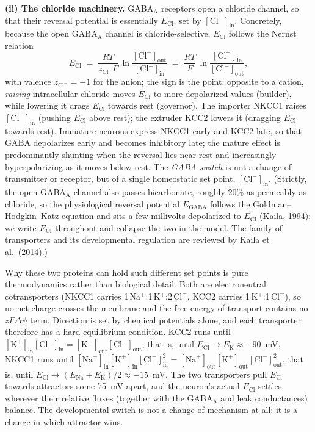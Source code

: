 \documentclass[11pt,a4paper]{article}
\newcommand{\Clm}{\mathrm{Cl}^{-}}
\newcommand{\ECl}{E_{\mathrm{Cl}}}
\begin{document}
\textbf{(ii) The chloride machinery.} GABA$_{\mathrm{A}}$ receptors open a chloride channel, so that their reversal potential is essentially $\ECl$, set by $[\Clm]_{\mathrm{in}}$. Concretely, because the open GABA$_{\mathrm{A}}$ channel is chloride-selective, $\ECl$ follows the Nernst relation
\begin{equation}
\ECl \;=\; \frac{RT}{z_{\Clm}F}\,\ln\frac{[\Clm]_{\mathrm{out}}}{[\Clm]_{\mathrm{in}}}
     \;=\; \frac{RT}{F}\,\ln\frac{[\Clm]_{\mathrm{in}}}{[\Clm]_{\mathrm{out}}},
\end{equation}
with valence $z_{\Clm}=-1$ for the anion; the sign is the point: opposite to a cation, \emph{raising} intracellular chloride moves $\ECl$ to more depolarized values (builder), while lowering it drags $\ECl$ towards rest (governor). The importer NKCC1 raises $[\Clm]_{\mathrm{in}}$ (pushing $\ECl$ above rest); the extruder KCC2 lowers it (dragging $\ECl$ towards rest). Immature neurons express NKCC1 early and KCC2 late, so that GABA depolarizes early and becomes inhibitory late; the mature effect is predominantly shunting when the reversal lies near rest and increasingly hyperpolarizing as it moves below rest. The \emph{GABA switch} is not a change of transmitter or receptor, but of a single homeostatic set point, $[\Clm]_{\mathrm{in}}$. (Strictly, the open GABA$_{\mathrm{A}}$ channel also passes bicarbonate, roughly $20\%$ as permeably as chloride, so the physiological reversal potential $E_{\mathrm{GABA}}$ follows the Goldman--Hodgkin--Katz equation and sits a few millivolts depolarized to $\ECl$ (Kaila, 1994); we write $\ECl$ throughout and collapse the two in the model. The family of transporters and its developmental regulation are reviewed by Kaila et al.\ (2014).)

Why these two proteins can hold such different set points is pure thermodynamics rather than biological detail. Both are electroneutral cotransporters (NKCC1 carries 1\,Na$^{+}$:1\,K$^{+}$:2\,$\Clm$, KCC2 carries 1\,K$^{+}$:1\,$\Clm$), so no net charge crosses the membrane and the free energy of transport contains no $zF\Delta\psi$ term. Direction is set by chemical potentials alone, and each transporter therefore has a hard equilibrium condition. KCC2 runs until $[\mathrm{K}^{+}]_{\mathrm{in}}[\Clm]_{\mathrm{in}}=[\mathrm{K}^{+}]_{\mathrm{out}}[\Clm]_{\mathrm{out}}$, that is, until $\ECl\rightarrow E_{\mathrm{K}}\approx-90$~mV. NKCC1 runs until $[\mathrm{Na}^{+}]_{\mathrm{in}}[\mathrm{K}^{+}]_{\mathrm{in}}[\Clm]_{\mathrm{in}}^{2}=[\mathrm{Na}^{+}]_{\mathrm{out}}[\mathrm{K}^{+}]_{\mathrm{out}}[\Clm]_{\mathrm{out}}^{2}$, that is, until $\ECl\rightarrow(E_{\mathrm{Na}}+E_{\mathrm{K}})/2\approx-15$~mV. The two transporters pull $\ECl$ towards attractors some 75~mV apart, and the neuron's actual $\ECl$ settles wherever their relative fluxes (together with the GABA$_{\mathrm{A}}$ and leak conductances) balance. The developmental switch is not a change of mechanism at all: it is a change in which attractor wins.
\end{document}
